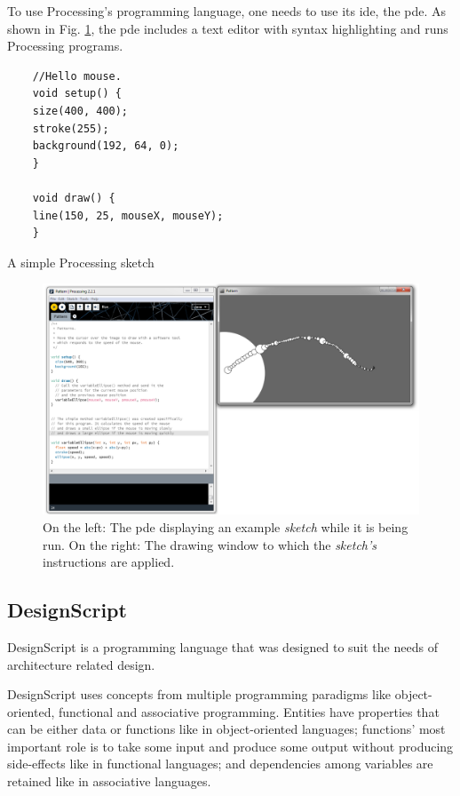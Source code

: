 To use Processing's programming language, one needs to use its \gls{ide}, the \acrfull{pde}.
As shown in Fig. \ref{fig:proc:dev:env}, the \gls{pde} includes a text editor with syntax highlighting and runs Processing programs.

\begin{listing}
	\begin{verbatim}
	//Hello mouse.
	void setup() {
	size(400, 400);
	stroke(255);
	background(192, 64, 0);
	}

	void draw() {
	line(150, 25, mouseX, mouseY);
	}
	\end{verbatim}
	\caption[A simple Processing sketch]{A simple Processing sketch}
	\label{lst:simple:processing}
\end{listing}

\begin{figure}
	\centering
	\includegraphics[width=1.0\textwidth]{images/proc_dev_env}
	\caption{On the left: The \gls{pde} displaying an example \emph{sketch} while it is being run. On the right: The drawing window to which the \emph{sketch's} instructions are applied.}
	\label{fig:proc:dev:env}
\end{figure}


\subsection{DesignScript}
\label{section:designscript:related}
DesignScript\cite{aish2012designscript} is a programming language that was designed to suit the needs of architecture related design.

DesignScript uses concepts from multiple programming paradigms like object-oriented, functional and associative programming.
Entities have properties that can be either data or functions like in object-oriented languages; functions' most important role is to take some input and produce some output without producing side-effects like in functional languages; and dependencies among variables are retained like in associative languages.

